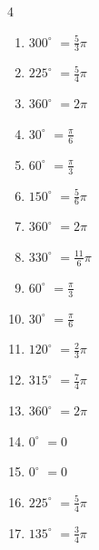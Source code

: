 \begin{multicols}{4}
\begin{enumerate}
\columnbreak %

  \item $\displaystyle 300^{\circ}$
        $\displaystyle =\frac{5}{3}\pi$

  \item $\displaystyle 225^{\circ}$
        $\displaystyle =\frac{5}{4}\pi$

  \item $\displaystyle 360^{\circ}$
        $\displaystyle =2\pi$

  \item $\displaystyle 30^{\circ}$
        $\displaystyle =\frac{\pi}{6}$

  \item $\displaystyle 60^{\circ}$
        $\displaystyle =\frac{\pi}{3}$

  \item $\displaystyle 150^{\circ}$
        $\displaystyle =\frac{5}{6}\pi$

  \item $\displaystyle 360^{\circ}$
        $\displaystyle =2\pi$

  \item $\displaystyle 330^{\circ}$
        $\displaystyle =\frac{11}{6}\pi$

  \item $\displaystyle 60^{\circ}$
        $\displaystyle =\frac{\pi}{3}$

  \item $\displaystyle 30^{\circ}$
        $\displaystyle =\frac{\pi}{6}$

  \item $\displaystyle 120^{\circ}$
        $\displaystyle =\frac{2}{3}\pi$

  \item $\displaystyle 315^{\circ}$
        $\displaystyle =\frac{7}{4}\pi$

  \item $\displaystyle 360^{\circ}$
        $\displaystyle =2\pi$

  \item $\displaystyle 0^{\circ}$
        $\displaystyle =0$

  \item $\displaystyle 0^{\circ}$
        $\displaystyle =0$

  \item $\displaystyle 225^{\circ}$
        $\displaystyle =\frac{5}{4}\pi$

  \item $\displaystyle 135^{\circ}$
        $\displaystyle =\frac{3}{4}\pi$


\end{enumerate}
\end{multicols}
